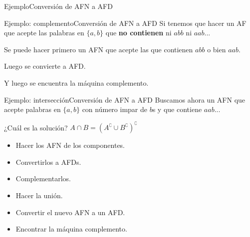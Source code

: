 \documentclass[spanish]{beamer}
\begin{document}
  \begin{frame}{Ejemplo}{Conversión de AFN a AFD}
    \begin{center}
    \end{center}      
  \end{frame}

  \begin{frame}{Ejemplo: complemento}{Conversión de AFN a AFD}
      Si tenemos que hacer un AF que acepte las palabras en $\{a,b\}$ que \textbf{no contienen} ni $abb$ ni $aab$... \pause

      \bigskip

      Se puede hacer primero un AFN que acepte las que contienen $abb$ o bien $aab$. \pause

      \bigskip

      Luego se convierte a AFD. \pause

      \bigskip

      Y luego se encuentra la máquina complemento.
  \end{frame}

  \begin{frame}{Ejemplo: intersección}{Conversión de AFN a AFD}
      Buscamos ahora un AFN que acepte palabras en $\{a,b\}$ con número impar de $b$s y que contiene $aab$... \pause
      
      \bigskip

      ¿Cuál es la solución? \pause $A \cap B = (A^\complement \cup B^\complement)^\complement$ \pause

      \bigskip

      \begin{itemize}
          \item Hacer los AFN de los componentes. \pause
          \item Convertirlos a AFDs. \pause
          \item Complementarlos. \pause
          \item Hacer la unión. \pause
          \item Convertir el nuevo AFN a un AFD. \pause
          \item Encontrar la máquina complemento.
      \end{itemize}
  \end{frame}
  
  
  
    
  
  
\end{document}
